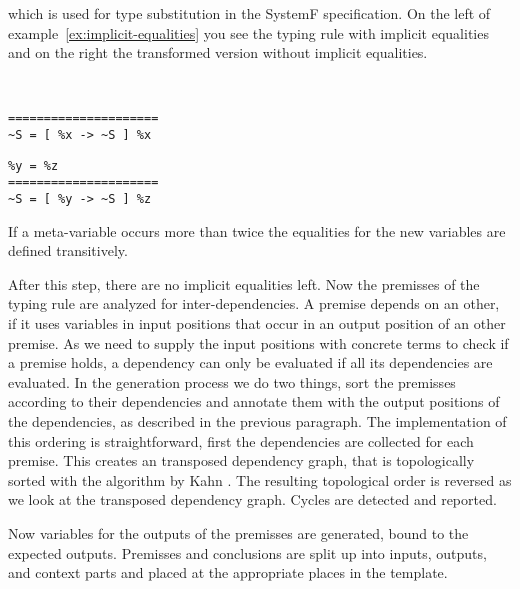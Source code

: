 which is used for type substitution in the SystemF specification. On
the left of example~\ref{ex:implicit-equalities} you see the typing
rule with implicit equalities and on the right the transformed version
without implicit equalities.

\begin{example}{~}
\newline
  \begin{minipage}[b]{.45\linewidth}
    \begin{verbatim}
=====================
~S = [ %x -> ~S ] %x
\end{verbatim}
  \end{minipage}
  \begin{minipage}[b]{.45\linewidth}
    \begin{verbatim}
%y = %z
=====================
~S = [ %y -> ~S ] %z
\end{verbatim}
  \end{minipage}
\label{ex:implicit-equalities}
\end{example}

If a meta-variable occurs more than twice the equalities for the new
variables are defined transitively.


After this step, there are no implicit equalities left. Now the
premisses of the typing rule are analyzed for inter-dependencies. A
premise depends on an other, if it uses variables in input positions
that occur in an output position of an other premise. As we need to
supply the input positions with concrete terms to check if a premise
holds, a dependency can only be evaluated if all its dependencies are
evaluated. In the generation process we do two things, sort the
premisses according to their dependencies and annotate them with the
output positions of the dependencies, as described in the previous
paragraph. The implementation of this ordering is straightforward,
first the dependencies are collected for each premise. This creates an
transposed dependency graph, that is topologically sorted with the
algorithm by Kahn \cite{Kahn:1962:TSL:368996.369025}. The resulting
topological order is reversed as we look at the transposed dependency
graph. Cycles are detected and reported.

Now variables for the outputs of the premisses are generated, bound to
the expected outputs. Premisses and conclusions are split up into
inputs, outputs, and context parts and placed at the appropriate
places in the template.

